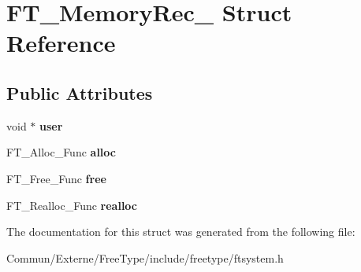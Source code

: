 \hypertarget{struct_f_t___memory_rec__}{}\section{F\+T\+\_\+\+Memory\+Rec\+\_\+ Struct Reference}
\label{struct_f_t___memory_rec__}
\subsection*{Public Attributes}
\begin{DoxyCompactItemize}
\item 
void $\ast$ {\bfseries user}\hypertarget{struct_f_t___memory_rec___aae5bc614434ba4525e37d7faaf03c4b7}{}\label{struct_f_t___memory_rec___aae5bc614434ba4525e37d7faaf03c4b7}

\item 
F\+T\+\_\+\+Alloc\+\_\+\+Func {\bfseries alloc}\hypertarget{struct_f_t___memory_rec___a2269eada6afbb008fe5c73707145410c}{}\label{struct_f_t___memory_rec___a2269eada6afbb008fe5c73707145410c}

\item 
F\+T\+\_\+\+Free\+\_\+\+Func {\bfseries free}\hypertarget{struct_f_t___memory_rec___a83ab2422bd9265d8731b9e5e368ba240}{}\label{struct_f_t___memory_rec___a83ab2422bd9265d8731b9e5e368ba240}

\item 
F\+T\+\_\+\+Realloc\+\_\+\+Func {\bfseries realloc}\hypertarget{struct_f_t___memory_rec___a5ce3424cc72e898fe973ffeabe44a95c}{}\label{struct_f_t___memory_rec___a5ce3424cc72e898fe973ffeabe44a95c}

\end{DoxyCompactItemize}


The documentation for this struct was generated from the following file\+:\begin{DoxyCompactItemize}
\item 
Commun/\+Externe/\+Free\+Type/include/freetype/ftsystem.\+h\end{DoxyCompactItemize}
